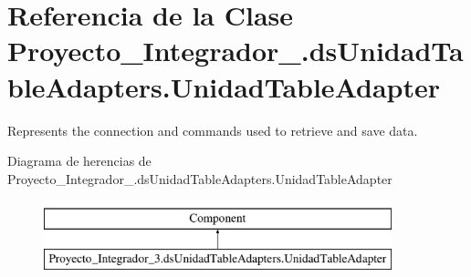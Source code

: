 \hypertarget{class_proyecto___integrador__3_1_1ds_unidad_table_adapters_1_1_unidad_table_adapter}{\section{Referencia de la Clase Proyecto\-\_\-\-Integrador\-\_.\-ds\-Unidad\-Table\-Adapters.\-Unidad\-Table\-Adapter}
\label{class_proyecto___integrador__3_1_1ds_unidad_table_adapters_1_1_unidad_table_adapter}
}


Represents the connection and commands used to retrieve and save data.  


Diagrama de herencias de Proyecto\-\_\-\-Integrador\-\_.\-ds\-Unidad\-Table\-Adapters.\-Unidad\-Table\-Adapter\begin{figure}[H]
\begin{center}
\leavevmode
\includegraphics[height=2.000000cm]{df/d2f/class_proyecto___integrador__3_1_1ds_unidad_table_adapters_1_1_unidad_table_adapter}
\end{center}
\end{figure}
